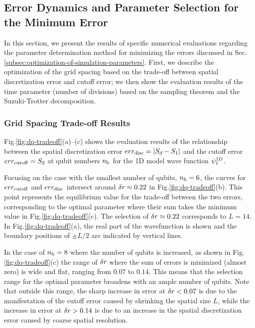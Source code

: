 \documentclass[aip-draft.tex]{subfiles}
\begin{document}

\subsection{Error Dynamics and Parameter Selection for the Minimum Error}
\label{subsec:parameter-selection-for-minimum-error-results}
In this section, we present the results of specific numerical evaluations
regarding the parameter determination method for minimizing the errors discussed
in Sec. \ref{subsec:optimization-of-simulation-parameters}. First, we describe
the optimization of the grid spacing based on the trade-off between spatial
discretization error and cutoff error; we then show the evaluation results
of the time parameter (number of divisions) based on the sampling theorem and
the Suzuki-Trotter decomposition.

\subsubsection{Grid Spacing Trade-off Results}
\label{subsubsec:delta-r-selection-results}

Fig.\ref{fig:dq-tradeoff}(a)--(c) shows the evaluation results of the
relationship between the spatial discretization error $err_{\mathrm{disc}} = |S_d-S_1|$ and
the cutoff error $err_{\mathrm{cutoff}} = S_2$ at qubit numbers $n_{\mathrm{b}}$ for the 1D model wave
function $\psi^{\mathrm{1D}}_1$.

Focusing on the case with the smallest number of qubits, $n_{\mathrm{b}}=6$, the curves for
$err_{\mathrm{cutoff}}$ and $err_{\mathrm{disc}}$ intersect around $\delta r \approx 0.22$ in
Fig.\ref{fig:dq-tradeoff}(b). This point represents the equilibrium value for
the trade-off between the two errors, corresponding to the optimal parameter
where their sum takes the minimum value in Fig.\ref{fig:dq-tradeoff}(c). The
selection of $\delta r\approx0.22$ corresponds to $L=14$. In
Fig.\ref{fig:dq-tradeoff}(a), the real part of the wavefunction is shown and the
boundary positions of $\pm L/2$ are indicated by vertical lines.

In the case of $n_{\mathrm{b}}=8$ where the number of qubits is increased, as shown in
Fig.\ref{fig:dq-tradeoff}(c) the range of $\delta r$ where the sum of errors is
minimized (almost zero) is wide and flat, ranging from $0.07$ to $0.14$. This
means that the selection range for the optimal parameter broadens with an ample
number of qubits. Note that outside this range, the sharp increase in error at
$\delta r < 0.07$ is due to the manifestation of the cutoff error caused by
shrinking the spatial size $L$, while the increase in error at $\delta r > 0.14$
is due to an increase in the spatial discretization error caused by coarse spatial
resolution.
\end{document}
